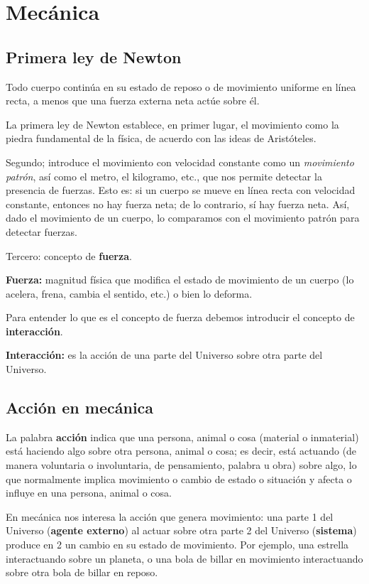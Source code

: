 \documentclass[../apunte_mecanica_clasica.tex]{subfiles}%
\begin{document}
\chapter{Mecánica}

\section{Primera ley de Newton}
Todo cuerpo continúa en su estado de reposo o de movimiento uniforme en línea recta, a menos que una fuerza externa neta actúe sobre él.

La primera ley de Newton establece, en primer lugar, el movimiento como la piedra fundamental de la física, de acuerdo con las ideas de Aristóteles. 

Segundo; introduce el movimiento con velocidad constante como un \emph{movimiento patrón}, así como el metro, el kilogramo, etc., que nos permite detectar la presencia de fuerzas. Esto es: si un cuerpo se mueve en línea recta con velocidad constante, entonces no hay fuerza neta; de lo contrario, sí hay fuerza neta. Así, dado el movimiento de un cuerpo, lo comparamos con el movimiento patrón para detectar fuerzas.

Tercero: concepto de \textbf{fuerza}.

\textbf{Fuerza:} magnitud física que modifica el estado de movimiento de un cuerpo (lo acelera, frena, cambia el sentido, etc.) o bien lo deforma.

Para entender lo que es el concepto de fuerza debemos introducir el concepto de \textbf{interacción}.

\textbf{Interacción:} es la acción de una parte del Universo sobre otra parte del Universo.

\section{Acción en mecánica}
La palabra \textbf{acción} indica que una persona, animal o cosa (material o inmaterial) está haciendo algo sobre otra persona, animal o cosa; es decir, está actuando (de manera voluntaria o involuntaria, de pensamiento, palabra u obra) sobre algo, lo que normalmente implica movimiento o cambio de estado o situación y afecta o influye en una persona, animal o cosa.

En mecánica nos interesa la acción que genera movimiento: una parte 1 del Universo (\textbf{agente externo}) al actuar sobre otra parte 2 del Universo (\textbf{sistema}) produce en 2 un cambio en su estado de movimiento. Por ejemplo, una estrella interactuando sobre un planeta, o una bola de billar en movimiento interactuando sobre otra bola de billar en reposo.



\newpage
\end{document}
